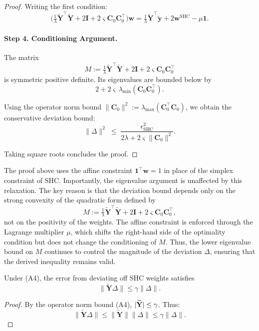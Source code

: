 \documentclass{article}
\begin{document}
\begin{proof}
Writing the first condition:
\[
\Big(\tfrac{1}{\lambda}\widetilde{\mathbf{Y}}^\top\widetilde{\mathbf{Y}}
+ 2\mathbf{I}
+ 2\varsigma\mathbf{C}_0\mathbf{C}_0^\top\Big)\mathbf{w}
= \tfrac{1}{\lambda}\widetilde{\mathbf{Y}}^\top\widetilde{\mathbf{y}}
+ 2\mathbf{w}^{\text{SHC}}
- \mu \mathbf{1}.
\]

\paragraph{Step 4. Conditioning Argument.}
The matrix
\[
M := \tfrac{1}{\lambda}\widetilde{\mathbf{Y}}^\top\widetilde{\mathbf{Y}}
+ 2\mathbf{I}
+ 2\varsigma\mathbf{C}_0\mathbf{C}_0^\top
\]
is symmetric positive definite. Its eigenvalues are bounded below by
\[
2 + 2\varsigma\,\lambda_{\min}(\mathbf{C}_0\mathbf{C}_0^\top).
\]

Using the operator norm bound $\|\mathbf{C}_0\|^2 := \lambda_{\max}(\mathbf{C}_0^\top\mathbf{C}_0)$, we obtain the conservative deviation bound:
\[
\|\Delta\|^2 \;\leq\; \frac{\epsilon_{\text{SHC}}^2}{2\lambda + 2\varsigma\|\mathbf{C}_0\|^2}.
\]

Taking square roots concludes the proof.
\end{proof}


\begin{remark}
The proof above uses the affine constraint $\mathbf{1}^\top \mathbf{w} = 1$ in place of the simplex
constraint of SHC. Importantly, the eigenvalue argument is unaffected by this relaxation.
The key reason is that the deviation bound depends only on the strong convexity of the
quadratic form defined by 
\[
M := \tfrac{1}{\lambda}\widetilde{\mathbf{Y}}^\top\widetilde{\mathbf{Y}}
+ 2\mathbf{I}
+ 2\varsigma\mathbf{C}_0\mathbf{C}_0^\top,
\]
not on the positivity of the weights.
The affine constraint is enforced through the Lagrange multiplier $\mu$, which shifts the
right-hand side of the optimality condition but does not change the conditioning of $M$.
Thus, the lower eigenvalue bound on $M$ continues to control the magnitude of the deviation
$\Delta$, ensuring that the derived inequality remains valid.
\end{remark}


\begin{lemma}
\label{lem:gamma}
Under (A4), the error from deviating off SHC weights satisfies
\[
\|\widetilde{\mathbf{Y}}\Delta\| \leq \gamma \|\Delta\|.
\]
\end{lemma}

\begin{proof}
By the operator norm bound (A4), $\\|\widetilde{\mathbf{Y}}\\| \leq \gamma$. Thus:
\[
\|\widetilde{\mathbf{Y}} \Delta\| \leq \|\widetilde{\mathbf{Y}}\| \|\Delta\| \leq \gamma \|\Delta\|.
\]
\end{proof}
\end{document}
